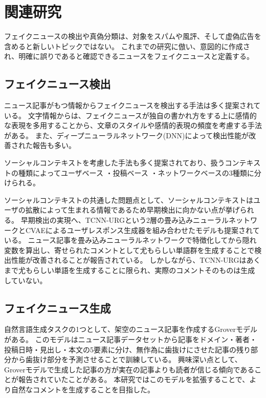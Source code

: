 \section{関連研究}
フェイクニュースの検出や真偽分類は、対象をスパム\cite{shen2017discovering}や風評\cite{7023340}、そして虚偽広告\cite{Huang:2017:DFO:3041021.3054233}を含めると新しいトピックではない。
これまでの研究\cite{Shu:2017:FND:3137597.3137600,Ruchansky:2017:CHD:3132847.3132877,Wang:2018:EEA:3219819.3219903}に倣い、意図的に作成され、明確に誤りであると確認できるニュースをフェイクニュースと定義する。

\subsection{フェイクニュース検出}
ニュース記事がもつ情報からフェイクニュースを検出する手法は多く提案されている。
文字情報からは、フェイクニュースが独自の書かれ方をする上に感情的な表現を多用することから、文章のスタイル\cite{DBLP:journals/corr/PotthastKRBS17}や感情的表現の頻度\cite{DBLP:journals/corr/abs-1903-01728}を考慮する手法がある。
また、ディープニューラルネットワーク(DNN)によって検出性能が改善された報告\cite{wang-2017-liar,karimi-tang-2019-learning,karimi-etal-2018-multi}も多い。

ソーシャルコンテキストを考慮した手法も多く提案されており、扱うコンテキストの種類によってユーザベース\cite{Castillo:2011:ICT:1963405.1963500,8397048,DBLP:journals/corr/abs-1904-13355}
・投稿ベース\cite{Yang2019UnsupervisedFN,Tacchini2017SomeLI,Jin:2016:NVE:3016100.3016318}
・ネットワークベース\cite{Wu:2018:TFF:3159652.3159677,DBLP:journals/corr/abs-1902-06673}の3種類に分けられる。

ソーシャルコンテキストの共通した問題点として、ソーシャルコンテキストはユーザの拡散によって生まれる情報であるため早期検出に向かない点が挙げられる。
早期検出の実現へ、TCNN-URGという2層の畳み込みニューラルネットワークとCVAEによるユーザレスポンス生成器を組み合わせたモデルも提案されている\cite{ijcai2018-533}。
ニュース記事を畳み込みニューラルネットワークで特徴化してから隠れ変数を算出し、寄せられたコメントとして尤もらしい単語群を生成することで検出性能が改善されることが報告されている。
しかしながら、TCNN-URGはあくまで尤もらしい単語を生成することに限られ、実際のコメントそのものは生成していない。

\subsection{フェイクニュース生成}
\label{subsec:generate}
自然言語生成タスクの1つとして、架空のニュース記事を作成するGroverモデルがある\cite{NIPS2019_9106}。
このモデルはニュース記事データセットから記事をドメイン・著者・投稿日時・見出し・本文の5要素に分け、無作為に歯抜けにさせた記事の残り部分から歯抜け部分を予測させることで訓練している。
興味深い点として、Groverモデルで生成した記事の方が実在の記事よりも読者が信じる傾向であることが報告されていたことがある。
本研究ではこのモデルを拡張することで、より自然なコメントを生成することを目指した。
